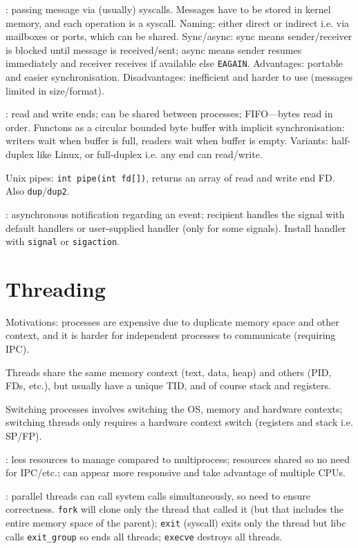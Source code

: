 \documentclass[fontsize=9pt,twoside]{slnotes}
\newcommand\benefits{\checkmark}
\newcommand\problems{\textsymbol{✗}}
\begin{document}
: passing message via (usually) syscalls. Messages have to be stored in kernel memory, and each operation is a syscall. Naming: either direct or indirect i.e. via mailboxes or ports, which can be shared. Sync/async: sync means sender/receiver is blocked until message is received/sent; async means sender resumes immediately and receiver receives if available else \texttt{EAGAIN}. Advantages: portable and easier synchronisation. Disadvantages: inefficient and harder to use (messages limited in size/format).

: read and write ends; can be shared between processes; FIFO---bytes read in order. Functons as a circular bounded byte buffer with implicit synchronisation: writers wait when buffer is full, readers wait when buffer is empty. Variants: half-duplex like Linux, or full-duplex i.e. any end can read/write.

Unix pipes: \texttt{int pipe(int fd[])}, returns an array of read and write end FD. Also \texttt{dup}/\texttt{dup2}.

: asynchronous notification regarding an event; recipient handles the signal with default handlers or user-supplied handler (only for some signals). Install handler with \texttt{signal} or \texttt{sigaction}.

\chapter{Threading}
Motivations: processes are expensive due to duplicate memory space and other context, and it is harder for independent processes to communicate (requiring IPC).

Threads share the same memory context (text, data, heap) and others (PID, FDs, etc.), but usually have a unique TID, and of course stack and registers.

Switching processes involves switching the OS, memory and hardware contexts; switching threads only requires a hardware context switch (registers and stack i.e. SP/FP).

\benefits: less resources to manage compared to multiprocess; resources shared so no need for IPC/etc.; can appear more responsive and take advantage of multiple CPUs.

\problems: parallel threads can call system calls simultaneously, so need to ensure correctness. \texttt{fork} will clone only the thread that called it (but that includes the entire memory space of the parent); \texttt{exit} (syscall) exits only the thread but libc calls \texttt{exit\_group} so ends all threads; \texttt{execve} destroys all threads.
\end{document}
